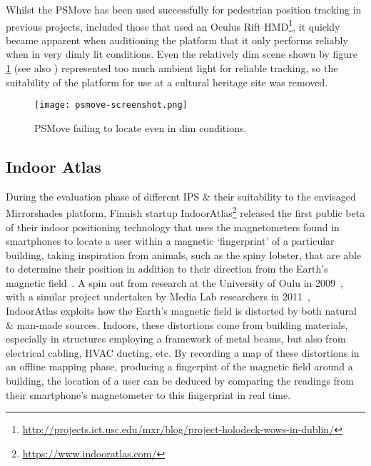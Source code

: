 Whilst the PSMove has been used successfully for pedestrian position tracking in previous projects, included those that used an Oculus Rift HMD\footnote{\url{http://projects.ict.usc.edu/mxr/blog/project-holodeck-wows-in-dublin/}}, it quickly became apparent when auditioning the platform that it only performs reliably when in very dimly lit conditions. Even the relatively dim scene shown by figure \ref{psmove-screenshot.png} (see also ) represented too much ambient light for reliable tracking, so the suitability of the platform for use at a cultural heritage site was removed.

\begin{figure}[h]
	\begin{center}
		\texttt{[image: psmove-screenshot.png]}
		\caption{PSMove failing to locate even in dim conditions.}
		\label{psmove-screenshot.png}
	\end{center}
\end{figure}


\subsection{Indoor Atlas}

During the evaluation phase of different IPS \& their suitability to the envisaged Mirrorshades platform, Finnish startup IndoorAtlas\footnote{\url{https://www.indooratlas.com/}} released the first public beta of their indoor positioning technology that uses the magnetometers found in smartphones to locate a user within a magnetic `fingerprint' of a particular building, taking inspiration from animals, such as the spiny lobster, that are able to determine their position in addition to their direction from the Earth's magnetic field~\cite{Boles2003}. A spin out from research at the University of Oulu in 2009~\cite{Haverinen2009,Haverinen2009a}, with a similar project undertaken by Media Lab researchers in 2011~\cite{Chung2011}, IndoorAtlas exploits how the Earth's magnetic field is distorted by both natural \& man-made sources. Indoors, these distortions come from building materials, especially in structures employing a framework of metal beams, but also from electrical cabling, HVAC ducting, etc. By recording a map of these distortions in an offline mapping phase, producing a fingerpint of the magnetic field around a building, the location of a user can be deduced by comparing the readings from their smartphone's magnetometer to this fingerprint in real time.

